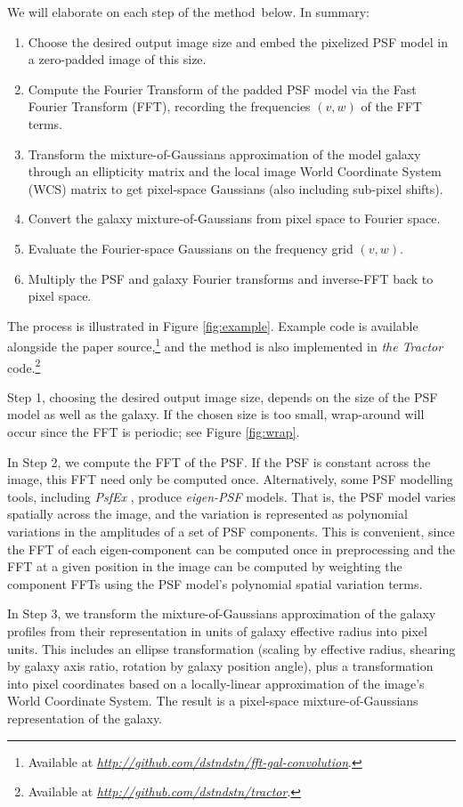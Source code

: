 \documentclass[11pt,preprint]{aastex}
\newcommand{\niceurl}[1]{\href{#1}{\textsl{#1}}}
\newcommand{\project}[1]{\textsl{#1}}
\newcommand{\trick}{method}
\begin{document}
We will elaborate on each step of the \trick\ below.  In summary:
\begin{enumerate}
\item Choose the desired output image size and embed the pixelized PSF
  model in a zero-padded image of this size.
\item Compute the Fourier Transform of the padded PSF model via the
  Fast Fourier Transform (FFT),
  recording the frequencies $(v, w)$ of the FFT terms.
\item Transform the mixture-of-Gaussians approximation of the model
  galaxy through an ellipticity matrix and the local image World
  Coordinate System (WCS) matrix to get pixel-space Gaussians
  (also including sub-pixel shifts).
\item Convert the galaxy mixture-of-Gaussians from pixel space to Fourier space.
\item Evaluate the Fourier-space Gaussians on the frequency grid $(v, w)$.
\item Multiply the PSF and galaxy Fourier transforms and inverse-FFT
  back to pixel space.
\end{enumerate}

The process is illustrated in Figure \ref{fig:example}.  Example code
is available alongside the paper source,\footnote{ Available at
  \niceurl{http://github.com/dstndstn/fft-gal-convolution}.}  and the
method is also implemented in \project{the Tractor} code.\footnote{%
  Available at
  \niceurl{http://github.com/dstndstn/tractor}.}

Step 1, choosing the desired output image size, depends on the size of
the PSF model as well as the galaxy.  If the chosen size is too small,
wrap-around will occur since the FFT is periodic; see Figure \ref{fig:wrap}.

In Step 2, we compute the FFT of the PSF.  If the PSF is constant
across the image, this FFT need only be computed once.  Alternatively,
some PSF modelling tools, including \project{PsfEx} \citep{psfex},
produce \emph{eigen-PSF} models.  That is, the PSF model varies
spatially across the image, and the variation is represented as
polynomial variations in the amplitudes of a set of PSF components.
This is convenient, since the FFT of each eigen-component can be
computed once in preprocessing and the FFT at a given position in the
image can be computed by weighting the component FFTs using the PSF
model's polynomial spatial variation terms.

In Step 3, we transform the mixture-of-Gaussians approximation of the
galaxy profiles from their representation in units of galaxy effective
radius into pixel units.  This includes an ellipse transformation
(scaling by effective radius, shearing by galaxy axis ratio, rotation
by galaxy position angle), plus a transformation into pixel
coordinates based on a locally-linear approximation of the image's
World Coordinate System.
The result is a pixel-space mixture-of-Gaussians representation of the
galaxy.
\end{document}
